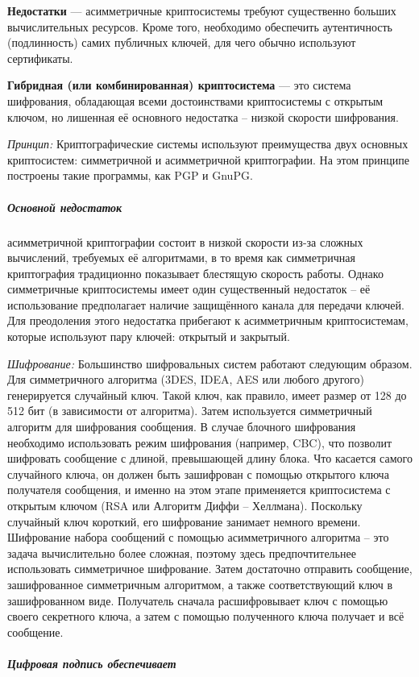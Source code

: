 \textbf{Недостатки} --- асимметричные криптосистемы требуют существенно
больших вычислительных ресурсов. Кроме того, необходимо обеспечить
аутентичность (подлинность) самих публичных ключей, для чего обычно
используют сертификаты.

\textbf{Гибридная (или комбинированная) криптосистема} --- это система
шифрования, обладающая всеми достоинствами криптосистемы с открытым ключом,
но лишенная её основного недостатка -- низкой скорости шифрования.

\emph{Принцип: }
Криптографические системы используют преимущества двух
основных криптосистем: симметричной и асимметричной криптографии. На этом
принципе построены такие программы, как PGP и GnuPG.

\subparagraph{Основной недостаток} асимметричной криптографии состоит в
низкой скорости из-за сложных вычислений, требуемых её алгоритмами, в то
время как симметричная криптография традиционно показывает блестящую скорость
работы. Однако симметричные криптосистемы имеет один существенный недостаток
-- её использование предполагает наличие защищённого канала для передачи
ключей. Для преодоления этого недостатка прибегают к асимметричным
криптосистемам, которые используют пару ключей: открытый и закрытый.

\emph{Шифрование: }Большинство шифровальных систем работают следующим
образом. Для симметричного алгоритма (3DES, IDEA, AES или любого другого)
генерируется случайный ключ. Такой ключ, как правило, имеет размер от 128 до
512 бит (в зависимости от алгоритма). Затем используется симметричный
алгоритм для шифрования сообщения. В случае блочного шифрования необходимо
использовать режим шифрования (например, CBC), что позволит шифровать
сообщение с длиной, превышающей длину блока. Что касается самого случайного
ключа, он должен быть зашифрован с помощью открытого ключа получателя
сообщения, и именно на этом этапе применяется криптосистема с открытым ключом
(RSA или Алгоритм Диффи -- Хеллмана). Поскольку случайный ключ короткий, его
шифрование занимает немного времени. Шифрование набора сообщений с помощью
асимметричного алгоритма -- это задача вычислительно более сложная, поэтому
здесь предпочтительнее использовать симметричное шифрование. Затем достаточно
отправить сообщение, зашифрованное симметричным алгоритмом, а также
соответствующий ключ в зашифрованном виде. Получатель сначала расшифровывает
ключ с помощью своего секретного ключа, а затем с помощью полученного ключа
получает и всё сообщение.

\subparagraph{Цифровая подпись обеспечивает}


